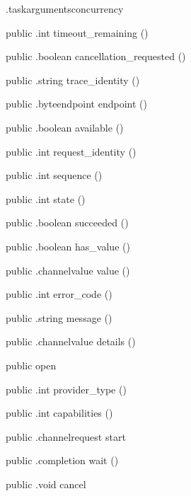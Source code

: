 \begin{CrexxClass}{.taskarguments}{concurrency}
\begin{Members}
    \Method
      {public}
      {.int}
      {timeout\_remaining}
      {()}

    \Method
      {public}
      {.boolean}
      {cancellation\_requested}
      {()}

    \Method
      {public}
      {.string}
      {trace\_identity}
      {()}

    \Method
      {public}
      {.byteendpoint}
      {endpoint}
      {()}

    \Method
      {public}
      {.boolean}
      {available}
      {()}

    \Method
      {public}
      {.int}
      {request\_identity}
      {()}

    \Method
      {public}
      {.int}
      {sequence}
      {()}

    \Method
      {public}
      {.int}
      {state}
      {()}

    \Method
      {public}
      {.boolean}
      {succeeded}
      {()}

    \Method
      {public}
      {.boolean}
      {has\_value}
      {()}

    \Method
      {public}
      {.channelvalue}
      {value}
      {()}

    \Method
      {public}
      {.int}
      {error\_code}
      {()}

    \Method
      {public}
      {.string}
      {message}
      {()}

    \Method
      {public}
      {.channelvalue}
      {details}
      {()}

    \Factory
      {public}
      {open}
      {}

    \Method
      {public}
      {.int}
      {provider\_type}
      {()}

    \Method
      {public}
      {.int}
      {capabilities}
      {()}

    \Method
      {public}
      {.channelrequest}
      {start}
      {}

    \Method
      {public}
      {.completion}
      {wait}
      {()}

    \Method
      {public}
      {.void}
      {cancel}
      {}


\end{Members}
\end{CrexxClass}
